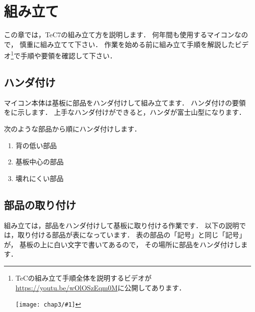 \renewcommand{\myincludegraphics}[2]{\texttt{[image: chap3/\#1]}}

\chapter{組み立て\label{kumitate}}

この章では，TeC7の組み立て方を説明します．
何年間も使用するマイコンなので，
慎重に組み立てて下さい．
作業を始める前に組み立て手順を解説したビデオ\footnote{
\begin{minipage}[t]{0.9\columnwidth}
\begin{minipage}{0.75\columnwidth}
TeCの組み立て手順全体を説明するビデオが
\url{https://youtu.be/wOlOSzEqm0M}に公開してあります．
\end{minipage}\hfill
\begin{minipage}{0.2\columnwidth}
\myincludegraphics{QR1.png}{scale=0.4}
\end{minipage}
\end{minipage}
}で手順や要領を確認して下さい．


\section{ハンダ付け}

マイコン本体は基板に部品をハンダ付けして組み立てます．
ハンダ付けの要領をに示します．
上手なハンダ付けができると，ハンダが富士山型になります．


次のような部品から順にハンダ付けします．

\begin{enumerate}
\item 背の低い部品
\item 基板中心の部品
\item 壊れにくい部品
\end{enumerate}

\section{部品の取り付け}
組み立ては，部品をハンダ付けして基板に取り付ける作業です．
以下の説明では，取り付ける部品が表になっています．
表の部品の「記号」と同じ「記号」が，
基板の上に白い文字で書いてあるので，
その場所に部品をハンダ付けします．

%

